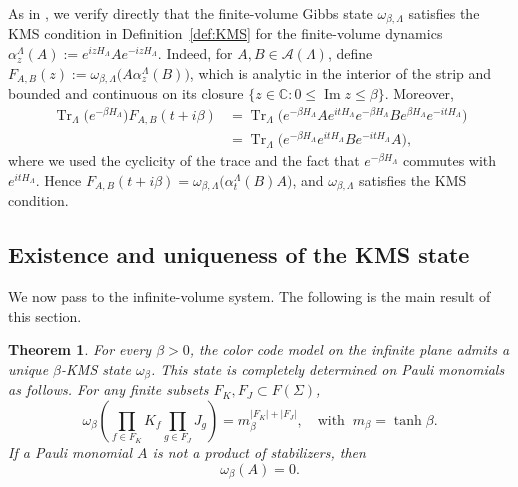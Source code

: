 \documentclass[a4paper,11pt]{article}
\newtheorem{theorem}{Theorem}[section]
\theoremstyle{definition}
\theoremstyle{remark}
\theoremstyle{remark}
\begin{document}
As in \cite[Section~2]{alicki2007statistical}, we verify directly that the finite-volume Gibbs state $\omega_{\beta,\Lambda}$ satisfies the KMS condition in Definition~\ref{def:KMS} for the finite-volume dynamics $\alpha_z^\Lambda(A):=e^{izH_\Lambda}Ae^{-izH_\Lambda}$. Indeed, for $A,B\in\mathcal A(\Lambda)$, define $ F_{A,B}(z):=\omega_{\beta,\Lambda}\bigl(A\alpha_z^\Lambda(B)\bigr)$, which is analytic in the interior of the strip and bounded and continuous on its closure $\{z\in\mathbb C:0\leq\operatorname{Im}z\leq\beta\}$. Moreover,
\[
\begin{aligned}
\operatorname{Tr}_\Lambda\!\bigl(e^{-\beta H_\Lambda}\bigr)F_{A,B}(t+i\beta)
&=\operatorname{Tr}_\Lambda\!\bigl(e^{-\beta H_\Lambda}A e^{itH_\Lambda}e^{-\beta H_\Lambda}B e^{\beta H_\Lambda}e^{-itH_\Lambda}\bigr)
\\
&= \operatorname{Tr}_\Lambda\!\bigl(e^{-\beta H_\Lambda}e^{itH_\Lambda}B e^{-itH_\Lambda}A\bigr),
\end{aligned}
\]
where we used the cyclicity of the trace and the fact that $e^{-\beta H_\Lambda}$ commutes with $e^{itH_\Lambda}$. Hence $F_{A,B}(t+i\beta) = \omega_{\beta,\Lambda}\bigl(\alpha_t^\Lambda(B)A\bigr)$, and $\omega_{\beta,\Lambda}$ satisfies the KMS condition.



\subsection{Existence and uniqueness of the KMS state}

We now pass to the infinite-volume system. The following is the main result of this section. 

\begin{theorem}\label{thm:unique_KMS}
    For every $\beta>0$, the color code model on the infinite plane admits a unique $\beta$-KMS state $\omega_\beta$. This state is completely determined on Pauli monomials as follows. For any finite subsets $F_K,F_J\subset F(\Sigma)$,
    \begin{equation}\label{eq:KMS_stabilizer_expectation}
        \omega_\beta\left(\prod_{f\in F_K}K_f\prod_{g\in F_J}J_g\right)=m_\beta^{|F_K|+|F_J|},\quad \text{with}\;\;  m_\beta=\tanh\beta.
    \end{equation}
    If a Pauli monomial $A$ is not a product of stabilizers, then 
    \begin{equation}\label{eq:KMS_nonstabilizer_zero}
        \omega_\beta(A)=0.
    \end{equation}
\end{theorem}
\end{document}
